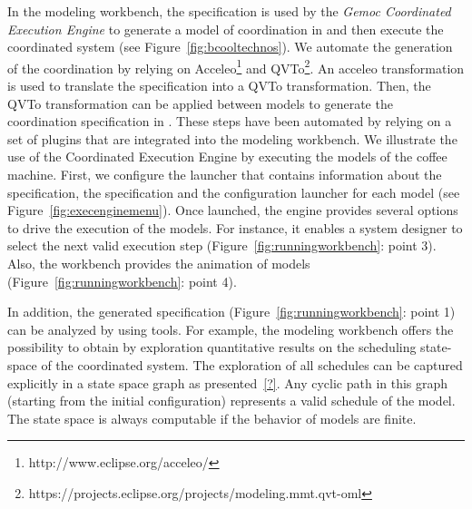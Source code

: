 In the modeling workbench, the \bflow specification is used by the \emph{Gemoc Coordinated Execution Engine} to generate a model of coordination in \ccsl and then execute the coordinated system (see Figure~\ref{fig:bcooltechnos}). We automate the generation of the coordination by relying on Acceleo\footnote{http://www.eclipse.org/acceleo/} and QVTo\footnote{https://projects.eclipse.org/projects/modeling.mmt.qvt-oml}. An acceleo transformation is used to translate the \bcool specification into a QVTo transformation. Then, the QVTo transformation can be applied between models to generate the coordination specification in \ccsl. These steps have been automated by relying on a set of plugins that are integrated into the modeling workbench. We illustrate the use of the Coordinated Execution Engine by executing the models of the coffee machine. First, we configure the launcher that contains information about the \bcool specification, the \bflow specification and the configuration launcher for each model (see Figure~\ref{fig:execenginemenu}). Once launched, the engine provides several options to drive the execution of the models. For instance, it enables a system designer to select the next valid execution step (Figure~\ref{fig:runningworkbench}: point 3). Also, the workbench provides the animation of models (Figure~\ref{fig:runningworkbench}: point 4). 

In addition, the generated \ccsl specification (Figure~\ref{fig:runningworkbench}: point 1) can be analyzed by using \ccsl tools. For example, the modeling workbench offers the possibility to obtain by exploration quantitative results on the scheduling state-space of the coordinated system. The exploration of all schedules can be captured explicitly in a state space graph as presented~\ref{?}. Any cyclic path in this graph (starting from the initial configuration) represents a valid schedule of the model. The state space is always computable if the behavior of models are finite.


